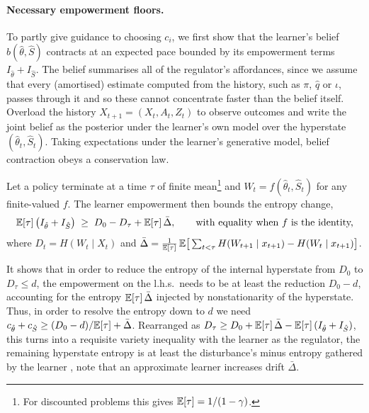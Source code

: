 \paragraph{Necessary empowerment floors.}
To partly give guidance to choosing $c_i$, we first show that the learner's belief $\hat b(\hat\theta, \hat S)$ contracts at an expected pace bounded by its empowerment terms $I_{\hat\theta} + I_{\hat S}$.
The belief summarises all of the regulator's affordances, since we assume that every (amortised) estimate computed from the history, such as $\pi$, $\hat q$ or $\iota$, passes through it and so these cannot concentrate faster than the belief itself.
Overload the history $X_{t+1} = (X_t, A_t, Z_t)$ to observe outcomes and write the joint belief as the posterior under the learner's own model over the hyperstate $(\hat\theta_t, \hat S_t)$.
Taking expectations under the learner's generative model, belief contraction obeys a conservation law.
\begin{proposition}\label{prop:budget}
    Let a policy terminate at a time $\tau$ of finite mean\footnote{For discounted problems this gives $\mathbb E [\tau] = 1/(1-\gamma)$.} and $W_t = f(\hat\theta_t, \hat S_t)$ for any finite-valued $f$.
    The learner empowerment then bounds the entropy change,
    \begin{equation}
      \mathbb E[\tau]\, \big(I_{\hat\theta} + I_{\hat S}\big) \;\ge\; D_0 - D_\tau + \mathbb E[\tau]\, \bar\Delta, \qquad \text{with equality when $f$ is the identity,}
      \label{eq:budget}
    \end{equation}
    where $D_t = H(W_t \mid X_t)$ and $\bar\Delta = \tfrac{1}{\mathbb E[\tau]}\, \mathbb E\big[\sum_{t<\tau} H(W_{t+1} \mid x_{t+1}) - H(W_t \mid x_{t+1})\big]$.
\end{proposition}
It shows that in order to reduce the entropy of the internal hyperstate from $D_0$ to $D_\tau \le d$, the empowerment on the l.h.s.\ needs to be at least the reduction $D_0 - d$, accounting for the entropy $\mathbb E[\tau]\,\bar\Delta$ injected by nonstationarity of the hyperstate.
Thus, in order to resolve the entropy down to $d$ we need $c_{\hat\theta} + c_{\hat S} \ge (D_0 - d)/\mathbb E[\tau] + \bar\Delta$.
Rearranged as $D_\tau \ge D_0 + \mathbb E[\tau]\,\bar\Delta - \mathbb E[\tau]\,(I_{\hat\theta} + I_{\hat S})$, this turns into a requisite variety inequality \citep{Ashby-introduction56} with the learner as the regulator, the remaining hyperstate entropy is at least the disturbance's minus entropy gathered by the learner \citep{Touchette-information00,Touchette-information04}, note that an approximate learner increases drift $\bar\Delta$.
